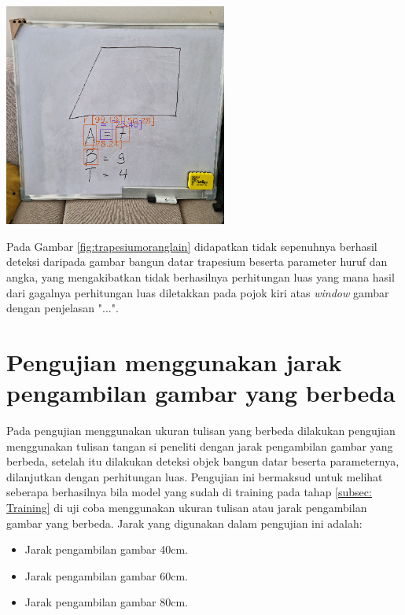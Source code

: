 \begin{center}
	\includegraphics[width=0.55\textwidth]{gambar/trapesium orang.png}
	\label{fig:trapesiumoranglain}
\end{center}
Pada Gambar \ref{fig:trapesiumoranglain} didapatkan tidak sepenuhnya berhasil deteksi daripada gambar bangun datar trapesium beserta parameter huruf dan angka, yang mengakibatkan tidak berhasilnya perhitungan luas yang mana hasil dari gagalnya perhitungan luas diletakkan pada pojok kiri atas \textit{window} gambar dengan penjelasan "...".

\section{Pengujian menggunakan jarak pengambilan gambar yang berbeda}
\label{sec:Hasil Metodologi}
Pada pengujian menggunakan ukuran tulisan yang berbeda dilakukan pengujian menggunakan tulisan tangan si peneliti dengan jarak pengambilan gambar yang berbeda, setelah itu dilakukan deteksi objek bangun datar beserta parameternya, dilanjutkan dengan perhitungan luas. Pengujian ini bermaksud untuk melihat seberapa berhasilnya bila model yang sudah di training pada tahap \ref{subsec: Training} di uji coba menggunakan ukuran tulisan atau jarak pengambilan gambar yang berbeda. Jarak yang digunakan dalam pengujian ini adalah:
\begin{itemize}
	\item Jarak pengambilan gambar 40cm.
	\item Jarak pengambilan gambar 60cm.
	\item Jarak pengambilan gambar 80cm.
\end{itemize}

